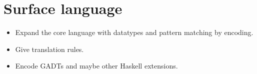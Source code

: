\section{Surface language}
\begin{itemize}
\item Expand the core language with datatypes and pattern matching by encoding.
\item Give translation rules.
\item Encode GADTs and maybe other Haskell extensions.
\end{itemize}